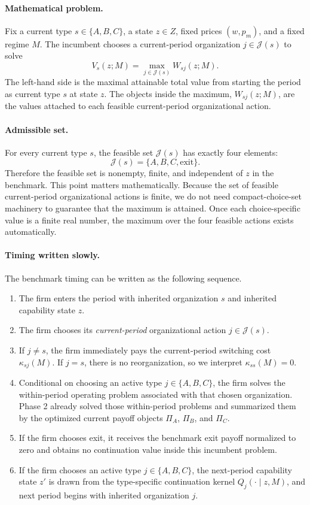 \paragraph{Mathematical problem.}
Fix a current type $s\in\{A,B,C\}$, a state $z\in Z$, fixed prices $(w,p_m)$, and a fixed regime $M$. The incumbent chooses a current-period organization $j\in\mathcal J(s)$ to solve
\[
V_s(z;M)=\max_{j\in\mathcal J(s)}W_{sj}(z;M).
\]
The left-hand side is the maximal attainable total value from starting the period as current type $s$ at state $z$. The objects inside the maximum, $W_{sj}(z;M)$, are the values attached to each feasible current-period organizational action.

\paragraph{Admissible set.}
For every current type $s$, the feasible set $\mathcal J(s)$ has exactly four elements:
\[
\mathcal J(s)=\{A,B,C,\mathrm{exit}\}.
\]
Therefore the feasible set is nonempty, finite, and independent of $z$ in the benchmark. This point matters mathematically. Because the set of feasible current-period organizational actions is finite, we do not need compact-choice-set machinery to guarantee that the maximum is attained. Once each choice-specific value is a finite real number, the maximum over the four feasible actions exists automatically.

\paragraph{Timing written slowly.}
The benchmark timing can be written as the following sequence.
\begin{enumerate}
    \item The firm enters the period with inherited organization $s$ and inherited capability state $z$.
    \item The firm chooses its \emph{current-period} organizational action $j\in\mathcal J(s)$.
    \item If $j\neq s$, the firm immediately pays the current-period switching cost $\kappa_{sj}(M)$. If $j=s$, there is no reorganization, so we interpret $\kappa_{ss}(M)=0$.
    \item Conditional on choosing an active type $j\in\{A,B,C\}$, the firm solves the within-period operating problem associated with that chosen organization. Phase 2 already solved those within-period problems and summarized them by the optimized current payoff objects $\Pi_A$, $\Pi_B$, and $\Pi_C$.
    \item If the firm chooses exit, it receives the benchmark exit payoff normalized to zero and obtains no continuation value inside this incumbent problem.
    \item If the firm chooses an active type $j\in\{A,B,C\}$, the next-period capability state $z'$ is drawn from the type-specific continuation kernel $Q_j(\cdot\mid z,M)$, and next period begins with inherited organization $j$.
\end{enumerate}

